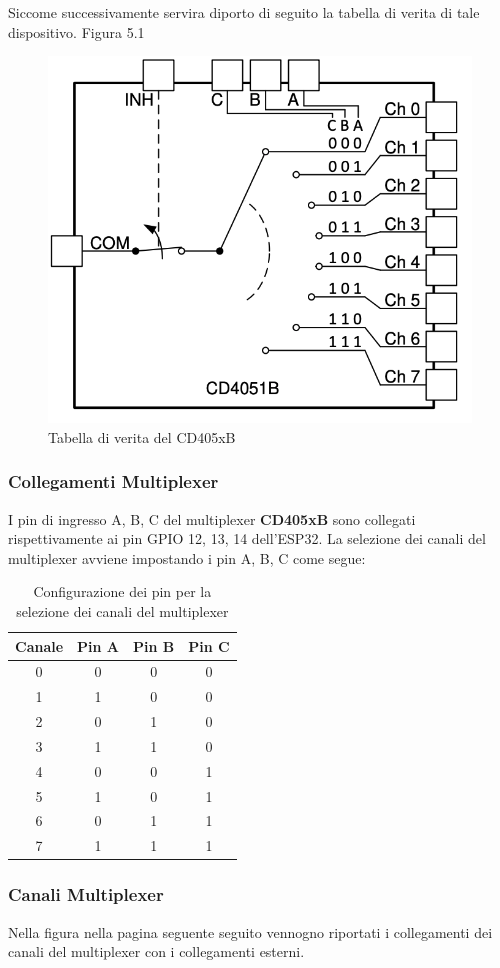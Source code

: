\documentclass[12pt,a4paper]{report}
\begin{document}
Siccome successivamente servira diporto di seguito la tabella di verita di tale dispositivo. Figura 5.1 \\
\begin{figure}[H]
    \centering
    \includegraphics[width=0.5\linewidth]{../image/CD405xB.png}
    \caption{Tabella di verita del CD405xB}
\end{figure}

\subsubsection{Collegamenti Multiplexer}

I pin di ingresso A, B, C del multiplexer \textbf{CD405xB} sono collegati rispettivamente ai pin GPIO 12, 13, 14 dell'ESP32. La selezione dei canali del multiplexer avviene impostando i pin A, B, C come segue:

\begin{table}[H]
    \centering
    \begin{tabular}{|c|c|c|c|}
        \hline
        \textbf{Canale} & \textbf{Pin A} & \textbf{Pin B} & \textbf{Pin C} \\ \hline
        0 & 0 & 0 & 0 \\ \hline
        1 & 1 & 0 & 0 \\ \hline
        2 & 0 & 1 & 0 \\ \hline
        3 & 1 & 1 & 0 \\ \hline
        4 & 0 & 0 & 1 \\ \hline
        5 & 1 & 0 & 1 \\ \hline
        6 & 0 & 1 & 1 \\ \hline
        7 & 1 & 1 & 1 \\ \hline
    \end{tabular}
    \caption{Configurazione dei pin per la selezione dei canali del multiplexer}
\end{table}

\subsubsection{Canali Multiplexer}
Nella figura nella pagina seguente seguito vennogno riportati i collegamenti dei canali del multiplexer con i collegamenti esterni. 
\end{document}
